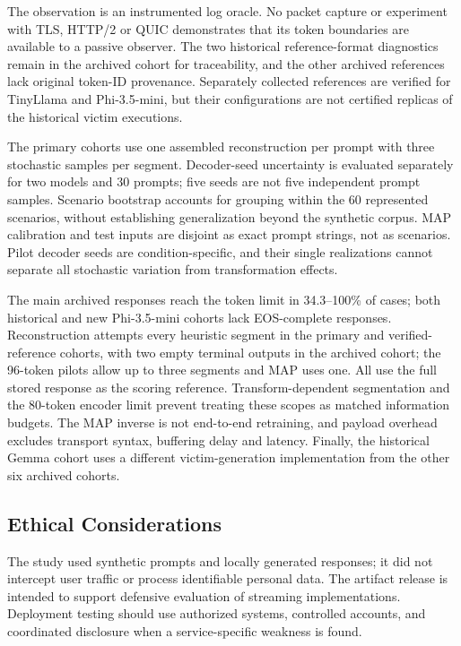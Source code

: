 \documentclass[electronics,article,submit,pdftex,moreauthors]{Definitions/mdpi}
\begin{document}
The observation is an instrumented log oracle. No packet capture or experiment with TLS, HTTP/2 or QUIC demonstrates that its token boundaries are available to a passive observer. The two historical reference-format diagnostics remain in the archived cohort for traceability, and the other archived references lack original token-ID provenance. Separately collected references are verified for TinyLlama and Phi-3.5-mini, but their configurations are not certified replicas of the historical victim executions.

The primary cohorts use one assembled reconstruction per prompt with three stochastic samples per segment. Decoder-seed uncertainty is evaluated separately for two models and 30 prompts; five seeds are not five independent prompt samples. Scenario bootstrap accounts for grouping within the 60 represented scenarios, without establishing generalization beyond the synthetic corpus. MAP calibration and test inputs are disjoint as exact prompt strings, not as scenarios. Pilot decoder seeds are condition-specific, and their single realizations cannot separate all stochastic variation from transformation effects.

The main archived responses reach the token limit in 34.3--100\% of cases; both historical and new Phi-3.5-mini cohorts lack EOS-complete responses. Reconstruction attempts every heuristic segment in the primary and verified-reference cohorts, with two empty terminal outputs in the archived cohort; the 96-token pilots allow up to three segments and MAP uses one. All use the full stored response as the scoring reference. Transform-dependent segmentation and the 80-token encoder limit prevent treating these scopes as matched information budgets. The MAP inverse is not end-to-end retraining, and payload overhead excludes transport syntax, buffering delay and latency. Finally, the historical Gemma cohort uses a different victim-generation implementation from the other six archived cohorts.

\subsection{Ethical Considerations}
The study used synthetic prompts and locally generated responses; it did not intercept user traffic or process identifiable personal data. The artifact release is intended to support defensive evaluation of streaming implementations. Deployment testing should use authorized systems, controlled accounts, and coordinated disclosure when a service-specific weakness is found.
\end{document}
